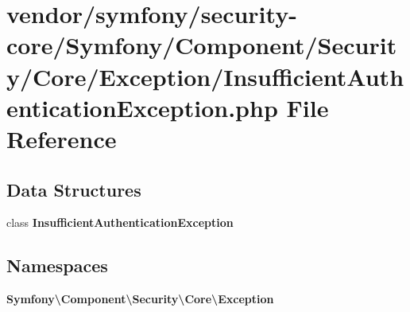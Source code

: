 \section{vendor/symfony/security-\/core/\+Symfony/\+Component/\+Security/\+Core/\+Exception/\+Insufficient\+Authentication\+Exception.php File Reference}
\label{_insufficient_authentication_exception_8php}
\subsection*{Data Structures}
\begin{DoxyCompactItemize}
\item 
class {\bf Insufficient\+Authentication\+Exception}
\end{DoxyCompactItemize}
\subsection*{Namespaces}
\begin{DoxyCompactItemize}
\item 
 {\bf Symfony\textbackslash{}\+Component\textbackslash{}\+Security\textbackslash{}\+Core\textbackslash{}\+Exception}
\end{DoxyCompactItemize}
